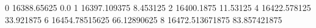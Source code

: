0 16388.65625 0.0
1 16397.109375 8.453125
2 16400.1875 11.53125
4 16422.578125 33.921875
6 16454.78515625 66.12890625
8 16472.513671875 83.857421875
